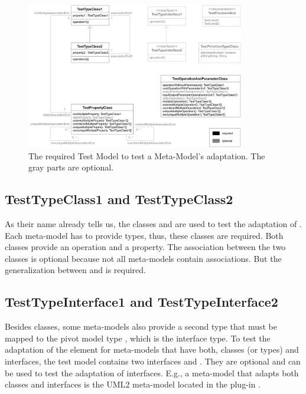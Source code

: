\begin{figure}
	\includegraphics[width=0.85\textwidth]{figures/metamodeltestsuite/testModel.pdf}
	\caption{The required Test Model to test a Meta-Model's adaptation. The gray parts are optional.}
	\label{pic:metaModelTestsuite:testModel}
\end{figure}


\subsection{TestTypeClass1 and TestTypeClass2}

As their name already tells us, the classes  and  are used to test the adaptation of . Each meta-model has to provide types, thus, these classes are required. Both classes provide an operation and a property. The association between the two classes is optional because not all meta-models contain associations. But the generalization between  and  is required.


\subsection{TestTypeInterface1 and TestTypeInterface2}

Besides classes, some meta-models also provide a second type that must be mapped to the pivot model type , which is the interface type. To test the adaptation of the  element for meta-models that have both, classes (or types) and interfaces, the test model contains two interfaces  and . They are optional and can be used to test the adaptation of interfaces. E.g., a meta-model that adapts both classes and interfaces is the \acs{UML}2 meta-model located in the plug-in .


